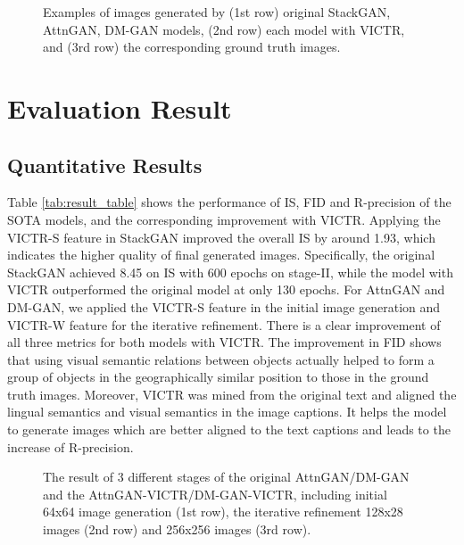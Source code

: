 \documentclass[11pt]{article}
\begin{document}
\begin{figure*}[t]
\centering
{}
\label{fig:comparision_a}
\label{fig:comparision_b}
\label{fig:comparision_c}
  \caption{Examples of images generated by (1st row) original StackGAN, AttnGAN, DM-GAN models, (2nd row) each model with VICTR, and (3rd row) the corresponding ground truth images.}
  \label{fig:comparison_stack}
  \vspace{-4mm}
\end{figure*}


\section{Evaluation Result}
\subsection{Quantitative Results}
Table \ref{tab:result_table} shows the performance of IS, FID and R-precision of the SOTA models, and the corresponding improvement with VICTR. Applying the VICTR-S feature in StackGAN improved the overall IS by around 1.93, which indicates the higher quality of final generated images. Specifically, the original StackGAN achieved 8.45 on IS with 600 epochs on stage-II, while the model with VICTR outperformed the original model at only 130 epochs. For AttnGAN and DM-GAN, we applied the VICTR-S feature in the initial image generation and VICTR-W feature for the iterative refinement. There is a clear improvement of all three metrics for both models with VICTR. The improvement in FID shows that using visual semantic relations between objects actually helped to form a group of objects in the geographically similar position to those in the ground truth images. Moreover, VICTR was mined from the original text and aligned the lingual semantics and visual semantics in the image captions. It helps the model to generate images which are better aligned to the text captions and leads to the increase of R-precision.



\begin{figure*}[t]
\centering
{}
\label{fig:3stage_a}
\label{fig:3stage_b}
\caption[Optional caption for list of figures]{The result of 3 different stages of the original AttnGAN/DM-GAN and the AttnGAN-VICTR/DM-GAN-VICTR, including initial 64x64 image generation (1st row), the iterative refinement 128x28 images (2nd row) and 256x256 images (3rd row).}
\label{fig:3stage}
\label{fig:DM_3stage}
\end{figure*}
\end{document}

